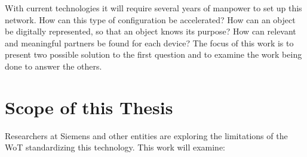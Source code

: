 With current technologies it will require several years of manpower to set up this network. How can this type of configuration be accelerated? How can an object be digitally represented, so that an object knows its purpose? How can relevant and meaningful partners be found for each device? The focus of this work is to present two possible solution to the first question and to examine the work being done to answer the others.

\begin{comment}

\subsection{Business Cases}
Consider a global pharmaceutical company, which would like to build a state-of-the-art factory abroad. They would like to equip each sensor and actuator on the production line with microcontrollers, so that each step of production can be electronically monitored. At present each microcontroller must be manually configured for the factory, which can require take several engineers several years, during which the company fails to profit. In order to save precious time, the company may choose to use existing platforms such as the Amazon AWS IoT. But this still requires each individual microcontroller to have the SDK available on it, so that the device can communicate with the device manager. Two possible solutions using Web of Things technology will be evaluated in this thesis.


Most of current IoT projects use devices, which were neither intended to be easily reprogrammable nor intended to be used in multiple domains. \cite{Guinard2016} Instead they rely on cloud-based rule engines to analyze data and add functionality. Many projects such as the Nest smart home system require users to purchase proprietary hardware. This is good for short-term profit margins, but bad for the long-term evolution of the IoT. Enter the \textit{Web of Things} (WoT). The WoT is intended to refine the IoT by using existing web technology to integrate devices into the web and thereby open the IoT to a wider group of developers.




\end{comment}

\section{Scope of this Thesis}
Researchers at Siemens and other entities are exploring the limitations of the WoT standardizing this technology. %
This work will examine:

